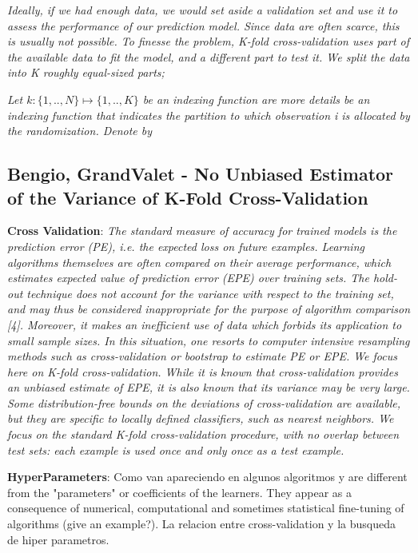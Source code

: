 \textit{Ideally, if we had enough data, we would set aside a validation set and use it to assess the performance of our prediction model. Since data are often scarce, this is usually not possible. To finesse the problem, K-fold cross-validation uses part of the available data to fit the model, and a different part to test it. We split the data into K roughly equal-sized parts; }

\textit{Let $k : \{1,..,N\} \mapsto \{1, .., K\}$ be an indexing function are more details be an indexing
function that indicates the partition to which observation i is allocated by the randomization. Denote by}


\subsection{Bengio, GrandValet - No Unbiased Estimator of the Variance of K-Fold Cross-Validation}
\textbf{Cross Validation}: 
\textit{The standard measure of accuracy for trained models is the prediction error (PE), i.e. the expected loss on future examples. Learning algorithms themselves are often compared on their average performance, which estimates expected value of prediction error (EPE) over training sets.
The hold-out technique does not account for the variance with respect to the training set, and may thus be considered inappropriate for the purpose of algorithm comparison [4]. Moreover, it makes an inefficient use of data which forbids its application to small sample sizes. In this situation, one resorts to computer intensive resampling methods such as cross-validation or bootstrap to estimate PE or EPE. We focus here on K-fold cross-validation. While it is known that cross-validation provides an unbiased estimate of EPE, it is also known that its variance may be very large.
Some distribution-free bounds on the deviations of cross-validation are available, but they are specific to locally defined classifiers, such as nearest neighbors.
We focus on the standard K-fold cross-validation procedure, with no overlap between test sets: each example is used once and only once as a test example.
}




\textbf{HyperParameters}:
Como van apareciendo en algunos algoritmos y are different from the "parameters" or coefficients of the learners. They appear as a consequence of numerical, computational and sometimes statistical fine-tuning of algorithms (give an example?). 
La relacion entre cross-validation y la busqueda de hiper parametros. 

\textit{}

\textit{}


